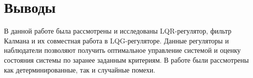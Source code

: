 
\FloatBarrier

\FloatBarrier

\FloatBarrier
\section{Выводы}
В данной работе была рассмотрены и исследованы LQR-регулятор, фильтр Калмана и их 
совместная работа в LQG-регуляторе. Данные регуляторы и наблюдатели позволяют 
получить оптимальное управление системой и оценку состояния системы по заранее 
заданным критериям. В работе были рассмотрены как детерминированные, так и случайные
помехи. 